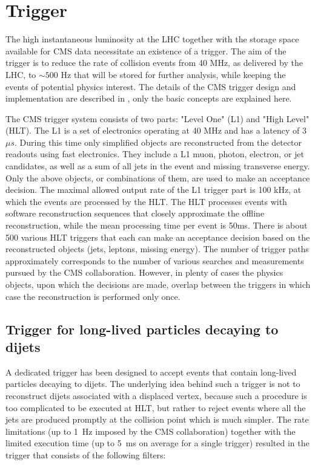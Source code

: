 \section{Trigger}

The high instantaneous luminosity at the LHC together with the storage space available for
CMS data necessitate an existence of a trigger.
 The aim of the trigger is to reduce the rate
of collision events from 40 MHz, as delivered by the LHC, to $\sim500$ Hz that will be stored
for further analysis, while keeping the events of potential physics interest.
The details of the CMS trigger design and implementation are described in \cite{Cittolin:578006},
only the basic concepts are explained here. 

The CMS trigger system consists of two parts: "Level One" (L1) and "High Level" (HLT).
The L1 is a set of electronics operating at 40 MHz and has a latency of 3~$\mu s$. During this
time only simplified 
objects are reconstructed from the detector readouts using fast electronics.
 They include a L1 muon, photon, 
electron, or jet candidates, as well as a sum of all jets in the event and missing transverse energy.
Only the above objects, or combinations of them, are used to make an acceptance decision. 
The maximal allowed output
rate of the L1 trigger part is 100 kHz, at which the events are processed by the HLT.
The HLT processes events with software reconstruction sequences that closely approximate
the offline reconstruction, while the mean processing time per event is 50ms. There is about 
500 various HLT triggers that each can make an acceptance decision based 
on the reconstructed objects
(jets, leptons, missing energy). The number of trigger paths approximately corresponds to the
number of various searches and measurements pursued by the CMS collaboration.
However, in plenty of cases the physics objects,
upon which the decisions are made, overlap between the triggers in which case the reconstruction 
is performed only once.


\subsection{Trigger for long-lived particles decaying to dijets}
\label{subsec:trigger}

A dedicated trigger has been designed to accept events that contain long-lived particles 
decaying to dijets. 
The underlying idea behind such a trigger is not to reconstruct dijets
associated with a displaced vertex, because such a procedure is too complicated to be executed 
at HLT, but rather to reject events where all the jets are produced promptly at the collision
point which is much simpler. The rate limitations (up to 1~Hz imposed by the CMS collaboration)
 together with the limited execution time (up to 5~ms on average for a single trigger)
resulted in the trigger that consists of the following filters:


